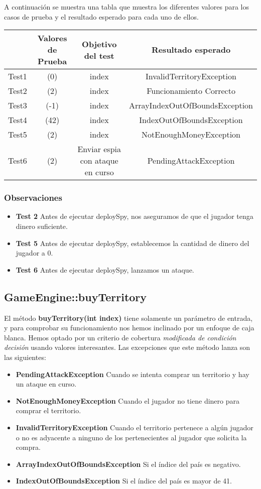 A continuación se muestra una tabla que muestra los diferentes valores para los casos de prueba y el resultado esperado para cada uno de ellos.

{\footnotesize
\begin{longtable}[c]{lccc}
 & \textbf{Valores de Prueba} & \textbf{Objetivo del test} & \textbf{Resultado esperado}  \\
\hline \hline
\endhead

Test1 & (0)& index & InvalidTerritoryException \\
Test2 & (2) & index & Funcionamiento Correcto \\
Test3 & (-1)  & index & ArrayIndexOutOfBoundsException \\
Test4 & (42)  & index & IndexOutOfBoundsException\\
Test5 & (2) & index & NotEnoughMoneyException \\
Test6 & (2)  & Enviar espia con ataque en curso  & PendingAttackException\\


\hline
\end{longtable}
\subsubsection{Observaciones}
\begin{itemize}
 \item \textbf{Test 2} Antes de ejecutar deploySpy, nos aseguramos de que el jugador tenga dinero suficiente.
\item \textbf{Test 5} Antes de ejecutar deploySpy, establecemos la cantidad de dinero del jugador a 0.
\item \textbf{Test 6} Antes de ejecutar deploySpy, lanzamos un ataque.
\end{itemize}

}
\subsection{GameEngine::buyTerritory}

El método \textbf{buyTerritory(int index)} tiene solamente un parámetro de entrada, y para comprobar su funcionamiento nos hemos inclinado por un enfoque de caja blanca. Hemos optado por un criterio de 
cobertura \textit{modificada de condición decisión } usando valores interesantes.
Las excepciones que este método lanza son las siguientes:
\begin{itemize}
\item \textbf{PendingAttackException} Cuando se intenta comprar un territorio y hay un ataque en curso.
\item \textbf{NotEnoughMoneyException} Cuando el jugador no tiene dinero para comprar el territorio.
\item \textbf{InvalidTerritoryException} Cuando el territorio pertenece a algún jugador o no es adyacente a ninguno de los pertenecientes al jugador que solicita la compra.
\item \textbf{ArrayIndexOutOfBoundsException} Si el índice del país es negativo.
\item \textbf{IndexOutOfBoundsException} Si el índice del país es mayor de 41.
\end{itemize}

